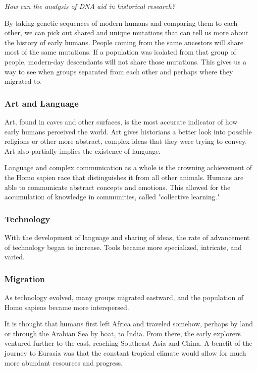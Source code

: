 \documentclass[11pt]{article}
\begin{document}
\emph{How can the analysis of DNA aid in historical research?}

By taking genetic sequences of modern humans and comparing them to each other, we can pick out shared and unique mutations that can tell us more about the history of early humans. People coming from the same ancestors will share most of the same mutations. If a population was isolated from that group of people, modern-day descendants will not share those mutations. This gives us a way to see when groups separated from each other and perhaps where they migrated to.

\subsubsection{Art and Language}
\label{sec:orgf5d5796}

Art, found in caves and other surfaces, is the most accurate indicator of how early humans perceived the world. Art gives historians a better look into possible religions or other more abstract, complex ideas that they were trying to convey. Art also partially implies the existence of language.

Language and complex communication as a whole is the crowning achievement of the Homo sapien race that distinguishes it from all other animals. Humans are able to communicate abstract concepts and emotions. This allowed for the accumulation of knowledge in communities, called "collective learning."

\subsubsection{Technology}
\label{sec:org101bdbc}

With the development of language and sharing of ideas, the rate of advancement of technology began to increase. Tools became more specialized, intricate, and varied.

\subsubsection{Migration}
\label{sec:org957783f}

As technology evolved, many groups migrated eastward, and the population of Homo sapiens became more interspersed.

It is thought that humans first left Africa and traveled somehow, perhaps by land or through the Arabian Sea by boat, to India. From there, the early explorers ventured further to the east, reaching Southeast Asia and China. A benefit of the journey to Eurasia was that the constant tropical climate would allow for much more abundant resources and progress.
\end{document}
